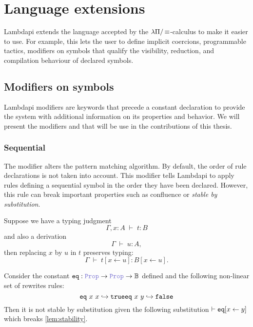 \section{Language extensions}
\label{sec:lambdapi-extension}

Lambdapi extends the language accepted by the $\lambda\Pi/\mathop{\equiv}$-calculus to make it easier to use.
For example, this lets the user to define implicit coercions, programmable tactics, modifiers on symbols that qualify the visibility, reduction, and compilation behaviour of declared symbols.

\subsection{Modifiers on symbols}
\label{sec:modifiers}

Lambdapi modifiers are keywords that precede a constant declaration to provide the system with additional information on its properties and behavior.
We will present the modifiers  and  that will be use in the contributions of this thesis.

\subsubsection{Sequential}
\label{ssec:sequential}

The modifier  alters the pattern matching algorithm.
By default, the order of rule declarations is not taken into account.
This modifier tells Lambdapi to apply rules defining a sequential symbol in the order they have been declared.
However, this rule can break important properties such as confluence or \emph{stable by substitution}.

\begin{lemma}\label{lem:stability}
Suppose we have a typing judgment
\[
  \Gamma, x : A \;\vdash\; t : B
\]
and also a derivation
\[
  \Gamma \;\vdash\; u : A ,
\]
then replacing $x$ by $u$ in $t$ preserves typing:
\[
  \Gamma \;\vdash\; t[x \leftarrow u] : B[x \leftarrow u] .
\]
\end{lemma}

\begin{example}
Consider the constant $\kw{eq}: \prop \ra \prop \ra \B$ defined  and the following non-linear set of rewrites rules:
\[
    \texttt{\upshape{eq}}~x~x \hookrightarrow \texttt{\upshape{true}}\\
    \texttt{\upshape{eq}}~x~y \hookrightarrow \texttt{\upshape{false}}
\]
Then it is not stable by substitution given the following substitution $\vdash\texttt{\upshape{eq}}[x \leftarrow y]$ which breaks \cref{lem:stability}.
\end{example}

